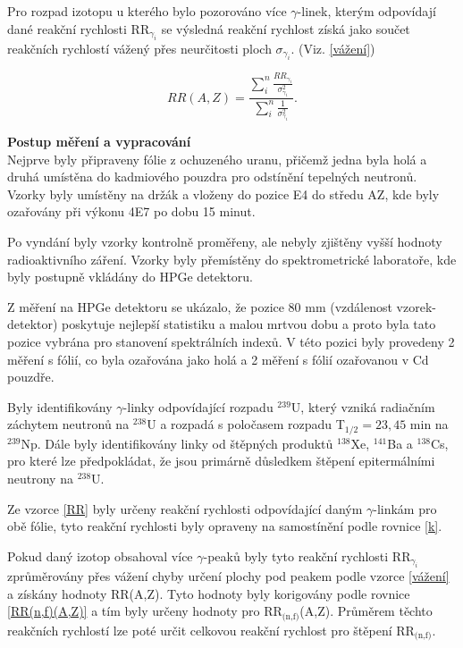 Pro rozpad izotopu u kterého bylo pozorováno více $\gamma$-linek, kterým odpovídají dané reakční rychlosti RR$_{\gamma_i}$ se výsledná reakční rychlost získá jako součet reakčních rychlostí vážený přes neurčitosti ploch $\sigma_{\gamma_i}$. (Viz. \eqref{vážení})

\begin{equation} \label{vážení}
    RR(A,Z) = \frac{\sum_i^n\frac{RR_{\gamma_i}}{\sigma_{\gamma_i}^2}}{\sum_i^n\frac{1}{\sigma_{\gamma_i}^2}}.
\end{equation}


\textbf{Postup měření a vypracování} \\
Nejprve byly připraveny fólie z ochuzeného uranu, přičemž jedna byla holá a druhá umístěna do kadmiového pouzdra pro odstínění tepelných neutronů. Vzorky byly umístěny na držák a vloženy do pozice E4 do středu AZ, kde byly ozařovány při výkonu 4E7 po dobu 15 minut. 

Po vyndání byly vzorky kontrolně proměřeny, ale nebyly zjištěny vyšší hodnoty radioaktivního záření. Vzorky byly přemístěny do spektrometrické laboratoře, kde byly postupně vkládány do HPGe detektoru.  

Z měření na HPGe detektoru se ukázalo, že pozice 80 mm (vzdálenost vzorek-detektor) poskytuje nejlepší statistiku a malou mrtvou dobu a proto byla tato pozice vybrána pro stanovení spektrálních indexů. V této pozici byly provedeny 2 měření s fólií, co byla ozařována jako holá a 2 měření s fólií ozařovanou v Cd pouzdře.

Byly identifikovány $\gamma$-linky odpovídající rozpadu $^{239}$U, který vzniká radiačním záchytem neutronů na $^{238}$U a rozpadá s poločasem rozpadu T$_\text{1/2} = 23,45$ min na $^{239}$Np. Dále byly identifikovány linky od štěpných produktů $^{138}$Xe, $^{141}$Ba a $^{138}$Cs, pro které lze předpokládat, že  jsou primárně důsledkem štěpení epitermálními neutrony na $^{238}$U.

Ze vzorce \eqref{RR} byly určeny reakční rychlosti odpovídající daným $\gamma$-linkám pro obě fólie, tyto reakční rychlosti byly opraveny na samostínění podle rovnice \eqref{k}.

Pokud daný izotop obsahoval více $\gamma$-peaků byly tyto reakční rychlosti RR$_{\gamma_i}$ zprůměrovány přes vážení chyby určení plochy pod peakem podle vzorce \eqref{vážení} a získány hodnoty RR(A,Z). Tyto hodnoty byly korigovány podle rovnice \eqref{RR(n,f)(A,Z)} a tím byly určeny hodnoty pro RR$_\text{(n,f)}$(A,Z). Průměrem těchto reakčních rychlostí lze poté určit celkovou reakční rychlost pro štěpení RR$_\text{(n,f)}$.

